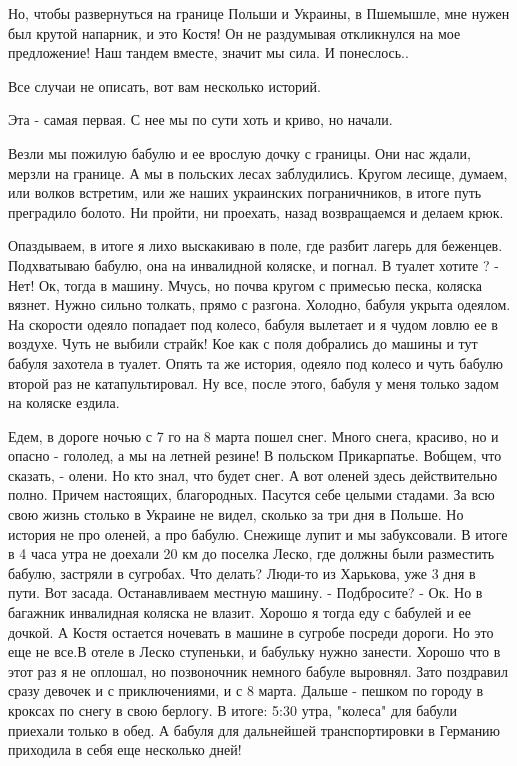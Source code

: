 Но, чтобы развернуться на границе Польши и Украины, в Пшемышле,  мне нужен был
крутой напарник, и это Костя! Он  не раздумывая откликнулся на мое предложение!
Наш тандем вместе, значит мы сила. И понеслось..

Все случаи не описать, вот вам несколько историй. 

Эта - самая  первая. С нее  мы по сути хоть и криво, но начали.

Везли мы пожилую бабулю и ее врослую дочку с границы. Они нас ждали, мерзли на
границе. А мы в  польских лесах заблудились. Кругом лесище, думаем, или волков
встретим, или же наших украинских пограничников, в итоге путь преградило
болото. Ни пройти, ни проехать, назад возвращаемся и делаем крюк.

Опаздываем, в  итоге я лихо выскакиваю в поле, где разбит лагерь для беженцев.
Подхватываю бабулю, она на инвалидной коляске, и погнал. В туалет хотите ? -
Нет! Ок, тогда в машину. Мчусь, но почва кругом с примесью песка, коляска
вязнет. Нужно сильно толкать, прямо с разгона. Холодно,  бабуля  укрыта
одеялом. На скорости одеяло попадает под колесо, бабуля вылетает и я чудом
ловлю ее в воздухе. Чуть не выбили страйк! Кое как с поля добрались до машины
и тут  бабуля захотела в туалет. Опять та же история, одеяло под колесо и чуть
бабулю второй раз не катапультировал. Ну все, после этого, бабуля у меня
только задом на коляске ездила.

Едем, в  дороге ночью с 7 го на 8 марта пошел снег.  Много снега, красиво, но и
опасно - гололед, а мы на летней резине!  В  польском Прикарпатье. Вобщем, что
сказать, - олени. Но кто знал, что будет снег. А вот   оленей здесь
действительно полно. Причем настоящих, благородных. Пасутся себе целыми
стадами.  За всю свою жизнь столько в Украине не видел, сколько за три дня в
Польше. Но история не про оленей, а про бабулю. Снежище лупит и мы забуксовали.
В итоге в 4 часа утра не доехали 20 км до поселка Леско, где должны были
разместить бабулю, застряли в сугробах. Что делать? Люди-то из Харькова, уже 3
дня в пути. Вот засада. Останавливаем местную машину. - Подбросите? - Ок. Но в
багажник инвалидная коляска не влазит. Хорошо я тогда еду с бабулей  и ее
дочкой. А Костя остается  ночевать в машине в сугробе посреди дороги. Но это
еще не все.В отеле в Леско ступеньки, и бабульку нужно занести. Хорошо что в
этот раз я не оплошал, но позвоночник немного бабуле выровнял. Зато поздравил
сразу девочек и с приключениями, и с 8 марта.  Дальше - пешком по городу в
кроксах по снегу в свою берлогу.  В итоге: 5:30 утра, "колеса" для бабули
приехали только в обед. А бабуля для дальнейшей транспортировки  в Германию
приходила в себя еще несколько дней! 

